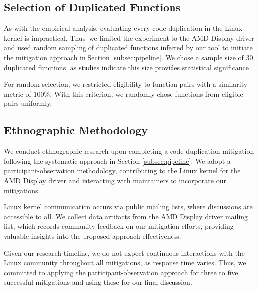 \subsection{Selection of Duplicated Functions}

As with the empirical analysis, evaluating every code duplication in the Linux kernel is impractical. Thus, we limited the experiment to the AMD Display driver and used random sampling of duplicated functions inferred by our tool to initiate the mitigation approach in Section \ref{subsec:pipeline}. We chose a sample size of 30 duplicated functions, as studies indicate this size provides statistical significance \citep{sample1, sample2}.

For random selection, we restricted eligibility to function pairs with a similarity metric of 100\%. With this criterion, we randomly chose functions from eligible pairs uniformly.

\subsection{Ethnographic Methodology}

We conduct ethnographic research upon completing a code duplication mitigation following the systematic approach in Section \ref{subsec:pipeline}. We adopt a participant-observation methodology, contributing to the Linux kernel for the AMD Display driver and interacting with maintainers to incorporate our mitigations.

Linux kernel communication occurs via public mailing lists, where discussions are accessible to all. We collect data artifacts from the AMD Display driver mailing list, which records community feedback on our mitigation efforts, providing valuable insights into the proposed approach effectiveness.

Given our research timeline, we do not expect continuous interactions with the Linux community throughout all mitigations, as response time varies. Thus, we committed to applying the participant-observation approach for three to five successful mitigations and using these for our final discussion.
